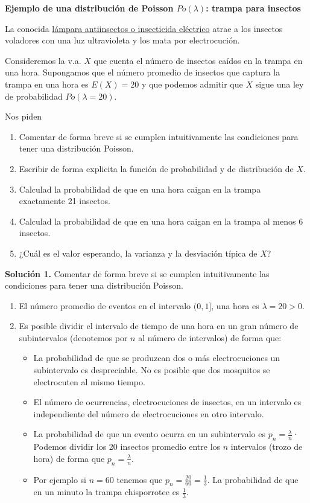 \documentclass[]{book}
\providecommand{\tightlist}{%
  \setlength{\itemsep}{0pt}\setlength{\parskip}{0pt}}
\begin{document}
\textbf{Ejemplo de una distribución de Poisson \(Po(\lambda)\): trampa para insectos}

La conocida \href{https://es.wikipedia.org/wiki/Insecticida_el\%C3\%A9ctrico}{lámpara antiinsectos o insecticida eléctrico} atrae a los insectos voladores con una luz ultravioleta y los mata por electrocución.

Consideremos la v.a. \(X\) que cuenta el número de insectos caídos en la trampa en una hora. Supongamos que el número promedio de insectos que captura la trampa en una hora es \(E(X)=20\) y que podemos admitir que \(X\) sigue una ley de probabilidad \(Po(\lambda=20)\).

Nos piden

\begin{enumerate}
\def\labelenumi{\arabic{enumi}.}
\tightlist
\item
  Comentar de forma breve si se cumplen intuitivamente las condiciones para tener una distribución Poisson.
\item
  Escribir de forma explicita la función de probabilidad y de distribución de \(X\).
\item
  Calculad la probabilidad de que en una hora caigan en la trampa exactamente 21 insectos.
\item
  Calculad la probabilidad de que en una hora caigan en la trampa al menos 6 insectos.
\item
  ¿Cuál es el valor esperando, la varianza y la desviación típica de \(X\)?
\end{enumerate}

\textbf{Solución 1.} Comentar de forma breve si se cumplen intuitivamente las condiciones para tener una distribución Poisson.

\begin{enumerate}
\def\labelenumi{\arabic{enumi}.}
\tightlist
\item
  El número promedio de eventos en el intervalo \((0,1]\), una hora es
  \(\lambda=20>0\).
\item
  Es posible dividir el intervalo de tiempo de una hora en un
  gran número de subintervalos (denotemos por \(n\) al número de intervalos) de forma que:

  \begin{itemize}
  \tightlist
  \item
    La probabilidad de que se produzcan dos o más electrocuciones un subintervalo es despreciable. No es posible que dos mosquitos se electrocuten al mismo tiempo.
  \item
    El número de ocurrencias, electrocuciones de insectos, en un intervalo es independiente del número de electrocuciones en otro intervalo.
  \item
    La probabilidad de que un evento ocurra en un subintervalo es \(p_n=\frac{\lambda}{n}\)· Podemos dividir los 20 insectos promedio entre los \(n\) intervalos (trozo de hora) de forma que \(p_n=\frac{\lambda}{n}\).
  \item
    Por ejemplo si \(n=60\) tenemos que \(p_n=\frac{20}{60}=\frac{1}{3}\). La probabilidad de que en un minuto la trampa chisporrotee es \(\frac{1}{3}\).
  \end{itemize}
\end{enumerate}
\end{document}
